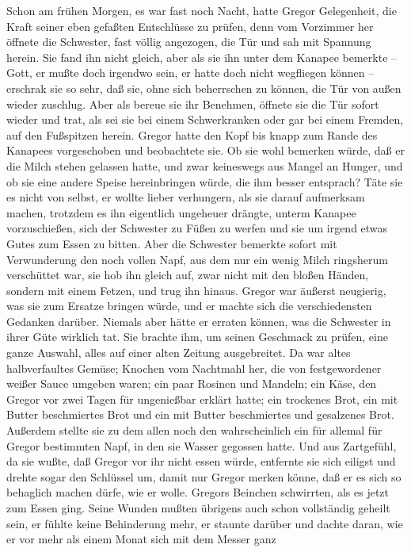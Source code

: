 Schon am frühen Morgen, es war fast noch Nacht, hatte Gregor
Gelegenheit, die Kraft seiner eben gefaßten Entschlüsse zu prüfen, denn
vom Vorzimmer her öffnete die Schwester, fast völlig angezogen, die Tür
und sah mit Spannung herein. Sie fand ihn nicht gleich, aber als sie ihn
unter dem Kanapee bemerkte -- Gott, er mußte doch irgendwo sein, er
hatte doch nicht wegfliegen können -- erschrak sie so sehr, daß sie,
ohne sich beherrschen zu können, die Tür von außen wieder zuschlug. Aber
als bereue sie ihr Benehmen, öffnete sie die Tür sofort wieder und trat,
als sei sie bei einem Schwerkranken oder gar bei einem Fremden, auf den
Fußspitzen herein. Gregor hatte den Kopf bis knapp zum Rande des
Kanapees vorgeschoben und beobachtete sie. Ob sie wohl bemerken würde,
daß er die Milch stehen gelassen hatte, und zwar keineswegs aus Mangel
an Hunger, und ob sie eine andere Speise hereinbringen würde, die ihm
besser entsprach? Täte sie es nicht von selbst, er wollte lieber
verhungern, als sie darauf aufmerksam machen, trotzdem es ihn eigentlich
ungeheuer drängte, unterm Kanapee vorzuschießen, sich der Schwester zu
Füßen zu werfen und sie um irgend etwas Gutes zum Essen zu bitten. Aber
die Schwester bemerkte sofort mit Verwunderung den noch vollen Napf, aus
dem nur ein wenig Milch ringsherum verschüttet war, sie hob ihn gleich
auf, zwar nicht mit den bloßen Händen, sondern mit einem Fetzen, und
trug ihn hinaus. Gregor war äußerst neugierig, was sie zum Ersatze
bringen würde, und er machte sich die verschiedensten Gedanken darüber.
Niemals aber hätte er erraten können, was die Schwester in ihrer Güte
wirklich tat. Sie brachte ihm, um seinen Geschmack zu prüfen, eine ganze
Auswahl, alles auf einer alten Zeitung ausgebreitet. Da war altes
halbverfaultes Gemüse; Knochen vom Nachtmahl her, die von festgewordener
weißer Sauce umgeben waren; ein paar Rosinen und Mandeln; ein Käse, den
Gregor vor zwei Tagen für ungenießbar erklärt hatte; ein trockenes Brot,
ein mit Butter beschmiertes Brot und ein mit Butter beschmiertes und
gesalzenes Brot. Außerdem stellte sie zu dem allen noch den
wahrscheinlich ein für allemal für Gregor bestimmten Napf, in den sie
Wasser gegossen hatte. Und aus Zartgefühl, da sie wußte, daß Gregor vor
ihr nicht essen würde, entfernte sie sich eiligst und drehte sogar den
Schlüssel um, damit nur Gregor merken könne, daß er es sich so behaglich
machen dürfe, wie er wolle. Gregors Beinchen schwirrten, als es jetzt
zum Essen ging. Seine Wunden mußten übrigens auch schon vollständig
geheilt sein, er fühlte keine Behinderung mehr, er staunte darüber und
dachte daran, wie er vor mehr als einem Monat sich mit dem Messer ganz
